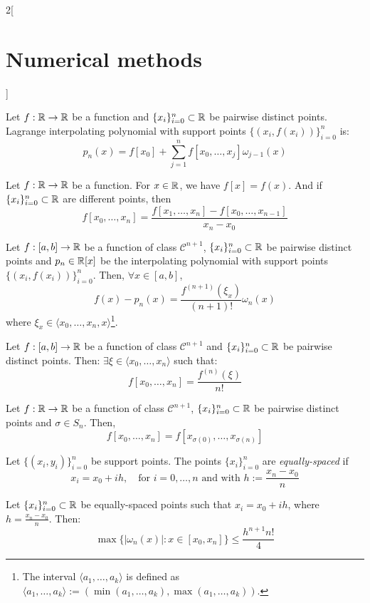 \documentclass[../../../main.tex]{subfiles}
\begin{document}
\begin{multicols}{2}[\section{Numerical methods}]
\begin{prop}
    Let $f:\mathbb{R}\rightarrow\mathbb{R}$ be a function and $\{x_i\}_{i=0}^n\subset\mathbb{R}$ be pairwise distinct points. Lagrange interpolating polynomial with support points $\{(x_i,f(x_i))\}_{i=0}^n$ is: $$p_n(x)=f[x_0]+\sum_{j=1}^nf[x_0,\ldots,x_j]\omega_{j-1}(x)$$
\end{prop}
\begin{method}
    Let $f:\mathbb{R}\rightarrow\mathbb{R}$ be a function. For $x\in\mathbb{R}$, we have $f[x]=f(x)$. And if $\{x_i\}_{i=0}^n\subset\mathbb{R}$ are different points, then $$f[x_0,\ldots,x_n]=\frac{f[x_1,\ldots,x_n]-f[x_0,\ldots,x_{n-1}]}{x_n-x_0}$$ 
\end{method}
\begin{theorem}
    Let $f:[a,b]\rightarrow\mathbb{R}$ be a function of class $\mathcal{C}^{n+1}$, $\{x_i\}_{i=0}^n\subset\mathbb{R}$ be pairwise distinct points and $p_n\in\mathbb{R}[x]$ be the interpolating polynomial with support points $\{(x_i,f(x_i))\}_{i=0}^n$. Then, $\forall x\in[a,b]$, $$f(x)-p_n(x)=\frac{f^{(n+1)}(\xi_x)}{(n+1)!}\omega_n(x)$$ where $\xi_x\in\langle x_0,\ldots,x_n,x\rangle$\footnote{The interval $\langle a_1,\ldots,a_k\rangle$ is defined as $\langle a_1,\ldots,a_k\rangle:=(\min(a_1,\ldots,a_k),\max(a_1,\ldots,a_k))$.}.
\end{theorem}
\begin{lemma}
    Let $f:[a,b]\rightarrow\mathbb{R}$ be a function of class $\mathcal{C}^{n+1}$ and $\{x_i\}_{i=0}^n\subset\mathbb{R}$ be pairwise distinct points. Then: $\exists\xi\in\langle x_0,\ldots,x_n\rangle$ such that: $$f[x_0,\ldots,x_n]=\frac{f^{(n)}(\xi)}{n!}$$ 
\end{lemma}
\begin{prop}
    Let $f:\mathbb{R}\rightarrow\mathbb{R}$ be a function of class $\mathcal{C}^{n+1}$, $\{x_i\}_{i=0}^n\subset\mathbb{R}$ be pairwise distinct points and $\sigma\in S_n$. Then, $$f[x_0,\ldots,x_n]=f[x_{\sigma(0)},\ldots,x_{\sigma(n)}]$$
\end{prop}
\begin{definition}
    Let $\{(x_i,y_i)\}_{i=0}^n$ be support points. The points $\{x_i\}_{i=0}^n$ are \textit{equally-spaced} if $$x_i=x_0+ih,\quad\text{for }i=0,\ldots,n\text{ and with }h:=\frac{x_n-x_0}{n}$$
\end{definition}
\begin{prop}
    Let $\{x_i\}_{i=0}^n\subset\mathbb{R}$ be equally-spaced points such that $x_i=x_0+ih$, where $h=\frac{x_n-x_0}{n}$. Then:
    $$\max\{|\omega_n(x)|:x\in[x_0,x_n]\}\leq\frac{h^{n+1}n!}{4}$$

\end{prop}
\end{multicols}
\end{document}
